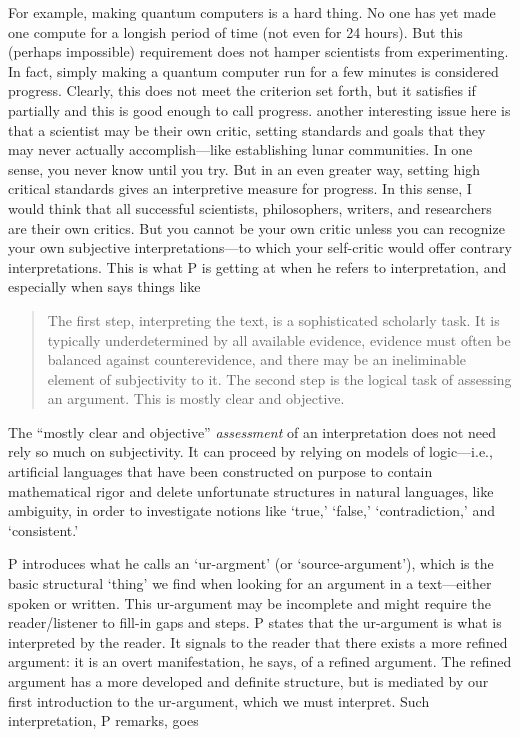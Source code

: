 \documentclass{article}
\begin{document}
For example, making quantum computers is a hard thing. No one has yet made one compute for a longish period of time (not even for 24 hours). But this (perhaps impossible) requirement does not hamper scientists from experimenting. In fact, simply making a quantum computer run for a few minutes is considered progress. Clearly, this does not meet the criterion set forth, but it satisfies if partially and this is good enough to call progress. another interesting issue here is that a scientist may be their own critic, setting standards and goals that they may never actually accomplish---like establishing lunar communities. In one sense, you never know until you try. But in an even greater way, setting high critical standards gives an interpretive measure for progress. In this sense, I would think that all successful scientists, philosophers, writers, and researchers are their own critics. But you cannot be your own critic unless you can recognize your own subjective interpretations---to which your self-critic would offer contrary interpretations. This is what P is getting at when he refers to interpretation, and especially when says things like

\begin{quote}
The first step, interpreting the text, is a sophisticated scholarly task.  It is typically underdetermined by all available evidence, evidence must often be balanced against counterevidence, and there may be an ineliminable element of subjectivity to it.  The second step is the logical task of assessing an argument.  This is mostly clear and objective.  
\end{quote}  
 
The ``mostly clear and objective'' \textsl{assessment} of an interpretation does not need rely so much on subjectivity. It can proceed by relying on models of logic---i.e., artificial languages that have been constructed on purpose to contain mathematical rigor and delete unfortunate structures in natural languages, like ambiguity, in order to investigate notions like `true,' `false,' `contradiction,' and `consistent.'

P introduces what he calls an `ur-argment' (or `source-argument'), which is the basic structural `thing' we find when looking for an argument in a text---either spoken or written. This ur-argument may be incomplete and might require the reader/listener to fill-in gaps and steps. P states that the ur-argument is what is interpreted by the reader. It signals to the reader that there exists a more refined argument: it is an overt manifestation, he says, of a refined argument. The refined argument has a more developed and definite structure, but is mediated by our first introduction to the ur-argument, which we must interpret. Such interpretation, P remarks, goes
\end{document}
